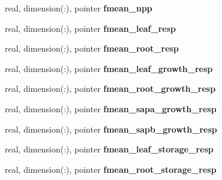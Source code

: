 \begin{DoxyCompactItemize}
\item 
\hypertarget{structed__state__vars_1_1patchtype_ac9d2c6dff7b536fe22bcd2e9808e5df7}{
real, dimension(:), pointer {\bfseries fmean\_\-npp}}
\label{structed__state__vars_1_1patchtype_ac9d2c6dff7b536fe22bcd2e9808e5df7}

\item 
\hypertarget{structed__state__vars_1_1patchtype_a3552158aea6ab3a9e047c3e208e68796}{
real, dimension(:), pointer {\bfseries fmean\_\-leaf\_\-resp}}
\label{structed__state__vars_1_1patchtype_a3552158aea6ab3a9e047c3e208e68796}

\item 
\hypertarget{structed__state__vars_1_1patchtype_a195fdf94098f3ff643a9bb653cc5545f}{
real, dimension(:), pointer {\bfseries fmean\_\-root\_\-resp}}
\label{structed__state__vars_1_1patchtype_a195fdf94098f3ff643a9bb653cc5545f}

\item 
\hypertarget{structed__state__vars_1_1patchtype_af8d319d999797848c4ab510889f436cd}{
real, dimension(:), pointer {\bfseries fmean\_\-leaf\_\-growth\_\-resp}}
\label{structed__state__vars_1_1patchtype_af8d319d999797848c4ab510889f436cd}

\item 
\hypertarget{structed__state__vars_1_1patchtype_ad3494772dd3ccc1f8545375d070ada28}{
real, dimension(:), pointer {\bfseries fmean\_\-root\_\-growth\_\-resp}}
\label{structed__state__vars_1_1patchtype_ad3494772dd3ccc1f8545375d070ada28}

\item 
\hypertarget{structed__state__vars_1_1patchtype_a9c002495f6e485bc92cb7ad3cef2fe18}{
real, dimension(:), pointer {\bfseries fmean\_\-sapa\_\-growth\_\-resp}}
\label{structed__state__vars_1_1patchtype_a9c002495f6e485bc92cb7ad3cef2fe18}

\item 
\hypertarget{structed__state__vars_1_1patchtype_a233534268877202bed16c6552a8e7b9d}{
real, dimension(:), pointer {\bfseries fmean\_\-sapb\_\-growth\_\-resp}}
\label{structed__state__vars_1_1patchtype_a233534268877202bed16c6552a8e7b9d}

\item 
\hypertarget{structed__state__vars_1_1patchtype_a6e064aee7bb0590fafe6e4809c782aff}{
real, dimension(:), pointer {\bfseries fmean\_\-leaf\_\-storage\_\-resp}}
\label{structed__state__vars_1_1patchtype_a6e064aee7bb0590fafe6e4809c782aff}

\item 
\hypertarget{structed__state__vars_1_1patchtype_a8718e22822175d92b21188d6142c7137}{
real, dimension(:), pointer {\bfseries fmean\_\-root\_\-storage\_\-resp}}
\label{structed__state__vars_1_1patchtype_a8718e22822175d92b21188d6142c7137}


\end{DoxyCompactItemize}
